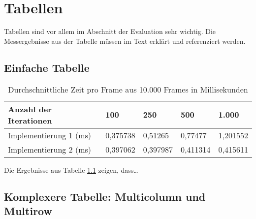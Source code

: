 \chapter{Tabellen}

Tabellen sind vor allem im Abschnitt der Evaluation sehr wichtig. Die Messergebnisse aus der Tabelle 
müssen im Text erklärt und referenziert werden.

\section{Einfache Tabelle}
\begin{table}[H]
\begin{center}
    \begin{tabular}{| l | l | l | l | l |}
    \hline
    Anzahl der Iterationen & 100 & 250 & 500 & 1.000 \\ \hline
    Implementierung 1 (ms) & 0,375738 & 0,51265 & 0,77477 & 1,201552 \\ \hline
    Implementierung 2 (ms) & 0,397062 & 0,397987 & 0,411314 & 0,415611 \\ \hline
    \end{tabular}
\end{center}
\caption{Durchschnittliche Zeit pro Frame aus 10.000 Frames in Millisekunden}
\label{tabelle_avarage_time}
\end{table}

Die Ergebnisse aus Tabelle \ref{tabelle_avarage_time} zeigen, dass\ldots\\

\section{Komplexere Tabelle: Multicolumn und Multirow}

